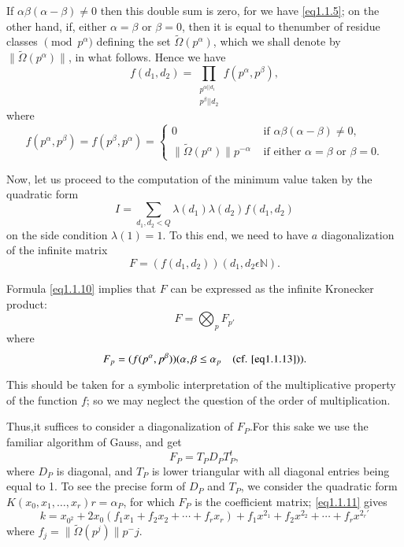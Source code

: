 If $\alpha \beta(\alpha - \beta) \neq 0$ then this double sum is zero,
for we have \eqref{eq1.1.5}; on the other hand, if, either $\alpha = \beta
\text{ or } \beta = 0$, then it is equal to the\pageoriginale number of residue
classes $\pmod{p^{\alpha}}$ defining the set
$\tilde{\Omega}(p^{\alpha})$, which we shall denote by
$\|\tilde{\Omega}(p^{\alpha}) \|$, in what follows. Hence we have  
\begin{equation*}
  f(d_1, d_2) = \prod_{\substack{p^{\alpha || d_1}\\ p^{\beta}|| d_2}}
  f(p^{\alpha}, p^{\beta}),\tag{1.1.10}\label{eq1.1.10}
\end{equation*}
where
\begin{equation*}
  f(p^{\alpha}, p^{\beta}) = f(p^{\beta}, p^{\alpha}) =
  \begin{cases}
    0 & \text{ if } \alpha \beta (\alpha - \beta) \neq 0,\\
    \| \tilde{\Omega}(p^{\alpha}) \| p^{-\alpha} &\text{ if either } \alpha
    = \beta \text{ or } \beta = 0.
  \end{cases}\tag{1.1.11}\label{eq1.1.11}
\end{equation*}

Now, let us proceed to the computation of the minimum value taken by
the quadratic form 
$$
I = \sum_{d_1, d_2 < Q} \lambda(d_1) \lambda(d_2) f(d_1, d_2)
$$
on the side condition $\lambda(1) = 1$. To this end, we need to have
$a$ diagonalization of the infinite matrix 
$$
F = (f(d_1, d_2)) (d_1, d_2 \epsilon \mathbb{N}).
$$

Formula \eqref{eq1.1.10} implies that $F$ can be expressed as the infinite
Kronecker product: 
\begin{equation*}
  F = \bigotimes _{p} F_{p'}\tag{1.1.12}\label{eq1.1.12}
\end{equation*}
where
$$
F_p = (f(p^\alpha, p^\beta)) (\alpha, \beta \leq \alpha _{p}\quad\text{(cf. \eqref{eq1.1.13})}).
$$

This should be taken for a symbolic interpretation of the
multiplicative property of the function $f$; so we may neglect the
question of the order of multiplication. 

Thus,\pageoriginale it suffices to consider a diagonalization of $F_P$.For this sake
we use the familiar algorithm of Gauss, and get 
\begin{equation*}
F_P=T_P D_P T_P^t,\tag{1.1.13}\label{eq1.1.13}
\end{equation*}
where $D_P$ is diagonal, and $T_P$ is lower triangular with all
diagonal entries being equal to 1. To see the precise form of $D_P$
and $T_P$, we consider the quadratic form $K(x_0, x_1, \ldots, x_r )
r =\alpha_P$, for which $F_P$ is the coefficient matrix;
\eqref{eq1.1.11} gives 
$$
k={x_{0^2}} + 2{x_0}({f_1} {x_1} + {f_2} {x_2} + \cdots + {f_r }
{x_r })+ {f_1} x^{2_1} + {f_2} x^{2_2} + \cdots + {f_r}
x^{2_r'} 
$$
where $f_j = \|\tilde{\Omega} (p^j) \| p^-j$.

